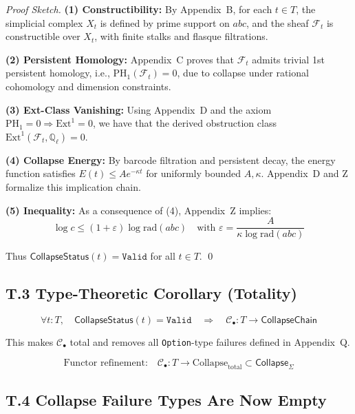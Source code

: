 \documentclass[11pt]{article}
\begin{document}
\begin{proof}[Proof Sketch]
\leavevmode

\textbf{(1) Constructibility:}  
By Appendix~B, for each \( t \in T \), the simplicial complex \( X_t \) is defined by prime support on \( abc \),  
and the sheaf \( \mathcal{F}_t \) is constructible over \( X_t \), with finite stalks and flasque filtrations.

\textbf{(2) Persistent Homology:}  
Appendix~C proves that \( \mathcal{F}_t \) admits trivial 1st persistent homology,  
i.e., \( \mathrm{PH}_1(\mathcal{F}_t) = 0 \), due to collapse under rational cohomology and dimension constraints.

\textbf{(3) Ext-Class Vanishing:}  
Using Appendix~D and the axiom \( \mathrm{PH}_1 = 0 \Rightarrow \mathrm{Ext}^1 = 0 \),  
we have that the derived obstruction class \( \mathrm{Ext}^1(\mathcal{F}_t, \mathbb{Q}_\ell) = 0 \).

\textbf{(4) Collapse Energy:}  
By barcode filtration and persistent decay, the energy function satisfies \( E(t) \leq A e^{-\kappa t} \)  
for uniformly bounded \( A, \kappa \). Appendix~D and Z formalize this implication chain.

\textbf{(5) Inequality:}  
As a consequence of (4), Appendix~Z implies:
\[
\log c \leq (1 + \varepsilon) \log \mathrm{rad}(abc)
\quad\text{with } \varepsilon = \frac{A}{\kappa \log \mathrm{rad}(abc)}
\]

Thus \( \mathsf{CollapseStatus}(t) = \texttt{Valid} \) for all \( t \in T \). \qed
\end{proof}

\subsection*{T.3 Type-Theoretic Corollary (Totality)}

\[
\forall t : T, \quad \mathsf{CollapseStatus}(t) = \texttt{Valid}
\quad\Rightarrow\quad
\mathcal{C}_\bullet : T \to \mathsf{CollapseChain}
\]

This makes \( \mathcal{C}_\bullet \) total and removes all \texttt{Option}-type failures defined in Appendix~Q.

\[
\text{Functor refinement:} \quad \mathcal{C}_\bullet : T \longrightarrow \mathrm{Collapse}_{\mathrm{total}} \subset \mathsf{Collapse}_{\Sigma}
\]

\subsection*{T.4 Collapse Failure Types Are Now Empty}
\end{document}
